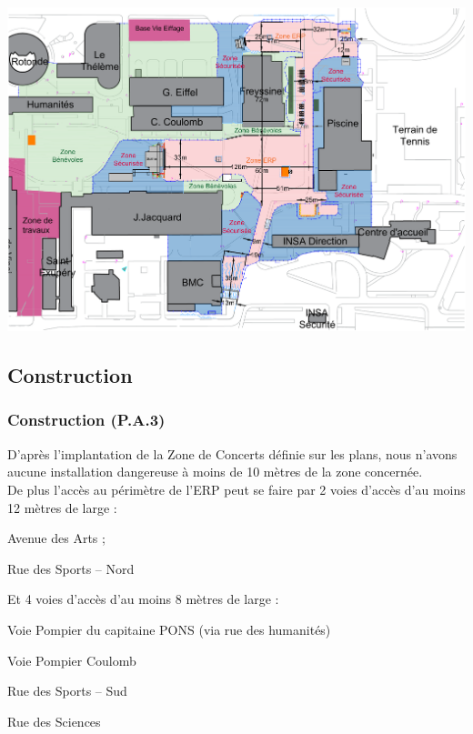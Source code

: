 \documentclass[hidelinks, paper=a4, fontsize=13pt]{report}
\begin{document}
\begin{center}
	\includegraphics[angle=90,width=.8\textwidth,keepaspectratio]{Exports/Plan_24h_45eme-Cotes}
\end{center}
\newpage
\subsection{Construction}

\subsubsection{Construction (P.A.3)} 
\label{refArticleERPContruction}
D’après l’implantation de la Zone de Concerts définie sur les plans, nous n’avons aucune installation dangereuse à moins de 10 mètres de la zone concernée. \\
De plus l’accès au périmètre de l’ERP peut se faire par 2 voies d’accès d’au moins 12 mètres de large : 
\begin{list}{•}{}
	\item Avenue des Arts ;
	\item Rue des Sports – Nord
\end{list}

Et 4 voies d’accès d’au moins 8 mètres de large : 
\begin{list}{•}{}
	\item Voie Pompier du capitaine PONS (via rue des humanités)
	\item Voie Pompier Coulomb
	\item Rue des Sports – Sud
	\item Rue des Sciences
\end{list}
\end{document}
